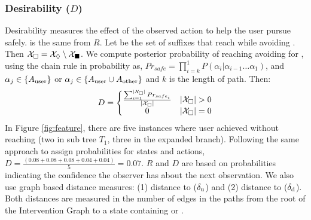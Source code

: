 \subsubsection{Desirability ($D$)}
Desirability measures the effect of the observed action to help the user pursue \desired safely.
\Suffixes is the same from $R$.
Let \SuffixesSafe be the set of suffixes that reach \desired while avoiding \undesired. Then $\mathcal{X}_{\square} =  \mathcal{X}_\Diamond\setminus\mathcal{X}_{\blacksquare}$.
We compute  posterior probability of reaching \desired avoiding \undesired for \SuffixesSafe, using the chain rule in probability as, $Pr_{safe}=\prod_{i=k}^{1}P(\alpha_i|\alpha_{i-1}\ldots \alpha_1)$, and $\alpha_{j} \in \lbrace A_{\textnormal{user}}\rbrace$ or $\alpha_j\in\lbrace A_{\textnormal{user}}\cup A_{\textnormal{other}}\rbrace$ and $k$ is the length of path. Then:
\begin{equation*} 
D = \left\{\begin{matrix}
\frac{\sum_{i=1}^{|\SuffixesSafe|}Pr_{safe_i}}{|\SuffixesSafe|} & |\SuffixesSafe|>0\\ 
0 &  |\SuffixesSafe|=0
\end{matrix}\right.
\end{equation*} 
In Figure \ref{fig:feature}, there are five instances where user achieved \desired  without reaching \undesired (two in sub tree $T_1$, three in the expanded branch). Following the same approach to assign probabilities for states and actions, $D= \frac{(0.08+0.08+0.08+0.04+0.04)}{5} = 0.07$.
$R$ and $D$ are based on probabilities indicating the confidence the observer has about the next observation. 
We also use graph based distance measures: (1) distance to \undesired  ($\delta_\mathrm{u}$) and (2) distance to \desired ($\delta_\mathrm{d}$). Both distances are measured in the number of edges in the paths from the root of the Intervention Graph to a state containing \desired or \undesired. 


